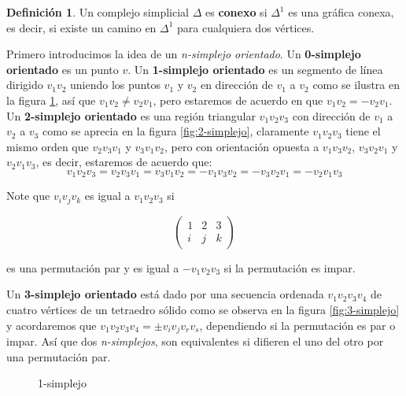 \documentclass[12pt]{book}
\theoremstyle{definition}
\newtheorem{definition}[theorem]{Definición}
\newcounter{in}
\newcounter{ini}
\begin{document}
\begin{definition}
  Un complejo simplicial $\Delta$ es \textbf{conexo} si
  $\Delta^{1}$ es una gráfica conexa, es decir, si existe un camino en
  $\Delta^{1}$  para cualquiera dos vértices.
\end{definition}

Primero introducimos la idea de un \emph{n-simplejo orientado}. Un
\textbf{0-simplejo orientado} es un punto $v$. Un \textbf{1-simplejo
  orientado} es un segmento de línea dirigido $v_{1}v_{2}$ uniendo los
puntos $v_{1}$ y $v_{2}$ en dirección de $v_{1}$ a $v_{2}$ como se
ilustra en la figura \ref{fig:1-simplejo}, así que
$v_{1}v_{2}\neq v_{2}v_{1}$, pero estaremos de acuerdo en que
$v_{1}v_{2}=-v_{2}v_{1}$. Un \textbf{2-simplejo orientado} es una
región triangular $v_{1}v_{2}v_{3}$ con dirección de $v_{1}$ a $v_{2}$
a $v_{3}$ como se aprecia en la figura \ref{fig:2-simplejo}, claramente $v_{1}v_{2}v_{3}$ tiene el mismo orden que
$v_{2}v_{3}v_{1}$ y $v_{3}v_{1}v_{2}$, pero con orientación opuesta a
$v_{1}v_{3}v_{2}$, $v_{3}v_{2}v_{1}$ y $v_{2}v_{1}v_{3}$, es decir, estaremos de acuerdo que:
$$v_{1}v_{2}v_{3}=v_{2}v_{3}v_{1}=v_{3}v_{1}v_{2}=-v_{1}v_{3}v_{2}=-v_{3}v_{2}v_{1}=-v_{2}v_{1}v_{3}$$

Note que $v_{i}v_{j}v_{k}$ es igual a $v_{1}v_{2}v_{3}$ si

\[ \left(
  \begin{array}{ccc}
    1 & 2 & 3 \\
    i & j & k 
  \end{array} 
\right)\] 

es una permutación par y es igual a $-v_{1}v_{2}v_{3}$ si la
permutación es impar.

Un \textbf{3-simplejo orientado} está dado por una secuencia ordenada
$v_{1}v_{2}v_{3}v_{4}$ de cuatro vértices de un tetraedro sólido
como se observa en la figura \ref{fig:3-simplejo} y
acordaremos que $v_{1}v_{2}v_{3}v_{4}=\pm v_{i}v_{j}v_{r}v_{s}$,
dependiendo si la permutación es par o impar. Así que dos
\emph{n-simplejos}, son equivalentes si difieren el uno del otro
por una permutación par. 

\begin{figure}[h]
  \centering
  
  \caption{1-simplejo}
  \label{fig:1-simplejo}
\end{figure}
\end{document}
